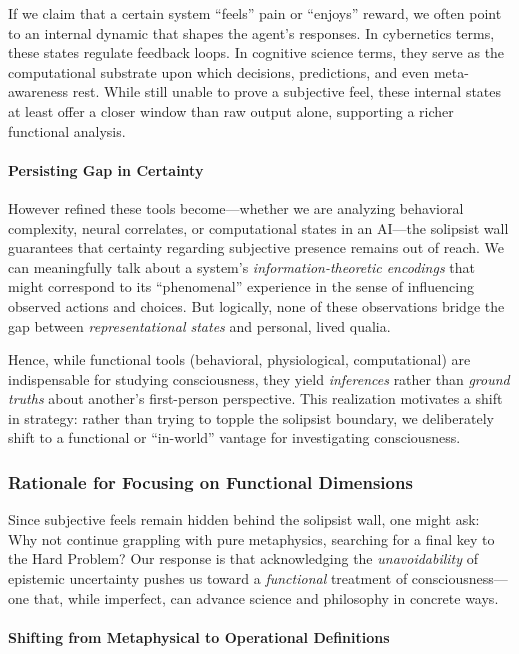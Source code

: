 \documentclass[12pt]{article}
\begin{document}
If we claim that a certain system ``feels'' pain or ``enjoys'' reward, we often point to an internal dynamic that shapes the agent's responses. In cybernetics terms, these states regulate feedback loops. In cognitive science terms, they serve as the computational substrate upon which decisions, predictions, and even meta-awareness rest. While still unable to prove a subjective feel, these internal states at least offer a closer window than raw output alone, supporting a richer functional analysis.

\paragraph{Persisting Gap in Certainty}

However refined these tools become---whether we are analyzing behavioral complexity, neural correlates, or computational states in an AI---the solipsist wall guarantees that certainty regarding subjective presence remains out of reach. We can meaningfully talk about a system's \textit{information-theoretic encodings} that might correspond to its ``phenomenal'' experience in the sense of influencing observed actions and choices. But logically, none of these observations bridge the gap between \textit{representational states} and personal, lived qualia.

Hence, while functional tools (behavioral, physiological, computational) are indispensable for studying consciousness, they yield \textit{inferences} rather than \textit{ground truths} about another's first-person perspective. This realization motivates a shift in strategy: rather than trying to topple the solipsist boundary, we deliberately shift to a functional or ``in-world'' vantage for investigating consciousness.

\subsubsection{Rationale for Focusing on Functional Dimensions}

Since subjective feels remain hidden behind the solipsist wall, one might ask: Why not continue grappling with pure metaphysics, searching for a final key to the Hard Problem? Our response is that acknowledging the \textit{unavoidability} of epistemic uncertainty pushes us toward a \textit{functional} treatment of consciousness---one that, while imperfect, can advance science and philosophy in concrete ways.

\paragraph{Shifting from Metaphysical to Operational Definitions}
\end{document}
